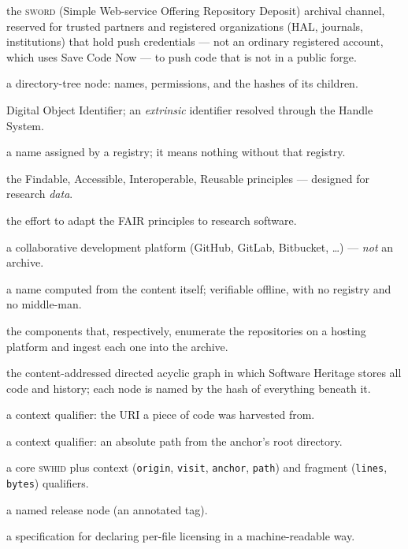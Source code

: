 \begin{description}[leftmargin=!,labelwidth=3.1cm,font=\bfseries,style=nextline]
  \item[Deposit] the \textsc{sword} (Simple Web-service Offering Repository Deposit) archival
        channel, reserved for trusted partners and registered organizations (HAL, journals,
        institutions) that hold push credentials --- not an ordinary registered account, which
        uses Save Code Now --- to push code that is not in a public forge.
  \item[Directory (\texttt{dir})] a directory-tree node: names, permissions, and the hashes of its
        children.
  \item[DOI] Digital Object Identifier; an \emph{extrinsic} identifier resolved through the Handle
        System.
  \item[Extrinsic identifier] a name assigned by a registry; it means nothing without that registry.
  \item[FAIR] the Findable, Accessible, Interoperable, Reusable principles --- designed for research
        \emph{data}.
  \item[FAIR4RS] the effort to adapt the FAIR principles to research software.
  \item[Forge] a collaborative development platform (GitHub, GitLab, Bitbucket, \dots) --- \emph{not}
        an archive.
  \item[Intrinsic identifier] a name computed from the content itself; verifiable offline, with no
        registry and no middle-man.
  \item[Lister / loader] the components that, respectively, enumerate the repositories on a hosting
        platform and ingest each one into the archive.
  \item[Merkle DAG] the content-addressed directed acyclic graph in which Software Heritage stores
        all code and history; each node is named by the hash of everything beneath it.
  \item[Origin] a context qualifier: the URI a piece of code was harvested from.
  \item[Path] a context qualifier: an absolute path from the anchor's root directory.
  \item[Qualified SWHID] a core \textsc{swhid} plus context (\texttt{origin}, \texttt{visit},
        \texttt{anchor}, \texttt{path}) and fragment (\texttt{lines}, \texttt{bytes}) qualifiers.
  \item[Release (\texttt{rel})] a named release node (an annotated tag).
  \item[REUSE] a specification for declaring per-file licensing in a machine-readable way.

\end{description}

